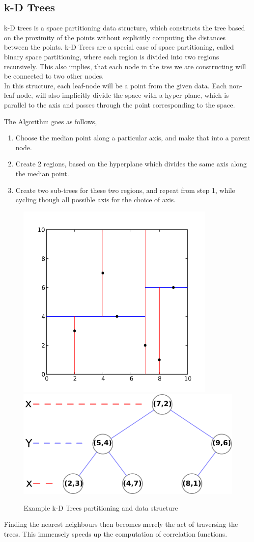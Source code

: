 \subsection{k-D Trees}
k-D trees is a space partitioning data structure,
which constructs the tree based on the proximity of the points without explicitly computing the distances between
the points. k-D Trees are a special case of space partitioning, called binary space partitioning, where each region is divided
into two regions recursively. This also implies, that each node in the \emph{tree} we are constructing will be connected to two other nodes.
\\
In this structure, each leaf-node will be a point from the given data. Each non-leaf-node, will also implicitly divide the space with a
hyper plane, which is parallel to the axis and passes through the point corresponding to the space.

The Algorithm goes as follows,
\begin{enumerate}
\item Choose the median point along a particular axis, and make that into a parent node.
\item Create 2 regions, based on the hyperplane which divides the same axis along the median point.
\item Create two sub-trees for these two regions, and repeat from step 1, while cycling though all possible axis for the choice of axis.
\end{enumerate}

\begin{figure}[H]
  \centering
  \includegraphics[width=0.3\linewidth]{kdtree_2d.png}
  \includegraphics[width=0.3\linewidth]{tree_2d.png}
  \caption{Example k-D Trees partitioning and data structure}
\end{figure}
Finding the nearest neighbours then becomes merely the act of traversing the trees. This immensely speeds
up the computation of correlation functions. 


